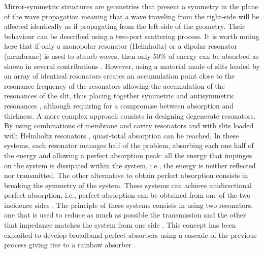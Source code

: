 Mirror-symmetric structures are geometries that present a symmetry in the plane of the wave propagation meaning that a wave traveling from the right-side will be affected identically as if propagating from the left-side of the geometry. Their behaviour can be described using a two-port scattering process\cite{merkel2015}. It is worth noting here that if only a monopolar resonator (Helmholtz) or a dipolar resonator (membrane) is used to absorb waves, then only 50\% of energy can be absorbed as shown in several contributions \cite{merkel2015,jimenez2017PRB}. However, using a material made of slits loaded by an array of identical resonators creates an accumulation point close to the resonance frequency of the resonators allowing the accumulation of the resonances of the slit, thus placing together symmetric and antisymmetric resonances \cite{romero2020perfect, yang2015, piper2014}, although requiring for a compromise between absorption and thickness. A more complex approach consists in designing degenerate resonators. By using combinations of membrane and cavity resonators \cite{yang2015, fu2017hybrid} and with slits loaded with Helmholtz resonators \cite{jimenez2017PRB}, quasi-total absorption can be reached. In these systems, each resonator manages half of the problem, absorbing each one half of the energy and allowing a perfect absorption peak: all the energy that impinges on the system is dissipated within the system, i.e., the energy is neither reflected nor transmitted. The other alternative to obtain perfect absorption consists in breaking the symmetry of the system. These systems can achieve unidirectional perfect absorption, i.e., perfect absorption can be obtained from one of the two incidence sides \cite{merkel2015}. The principle of these systems consists in using two resonators, one that is used to reduce as much as possible the transmission and the other that impedance matches the system from one side \cite{romero2016, groby2016use, jimenez2016}. This concept has been exploited to develop broadband perfect absorbers using a cascade of the previous process giving rise to a rainbow absorber \cite{jimenez2017}. 

